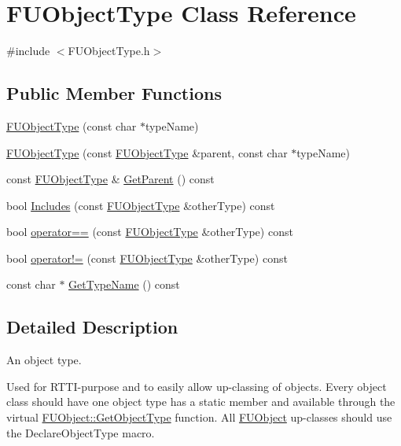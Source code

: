 \hypertarget{classFUObjectType}{
\section{FUObjectType Class Reference}
\label{classFUObjectType}
}


{\ttfamily \#include $<$FUObjectType.h$>$}

\subsection*{Public Member Functions}
\begin{DoxyCompactItemize}
\item 
\hyperlink{classFUObjectType_a2720b7c1dc89ba2b04067fb54651cfb2}{FUObjectType} (const char $\ast$typeName)
\item 
\hyperlink{classFUObjectType_a2ef2d00f85e58205470a634991bbd710}{FUObjectType} (const \hyperlink{classFUObjectType}{FUObjectType} \&parent, const char $\ast$typeName)
\item 
const \hyperlink{classFUObjectType}{FUObjectType} \& \hyperlink{classFUObjectType_a7b903f10975077d2d613a6cfe02762a8}{GetParent} () const 
\item 
bool \hyperlink{classFUObjectType_ac7bf4a03be4c6c482ca9e6df8771601b}{Includes} (const \hyperlink{classFUObjectType}{FUObjectType} \&otherType) const 
\item 
bool \hyperlink{classFUObjectType_a14945dfb834216b994e12e555c7e4ec6}{operator==} (const \hyperlink{classFUObjectType}{FUObjectType} \&otherType) const 
\item 
bool \hyperlink{classFUObjectType_a051455b488bf11ded50b271b261286dc}{operator!=} (const \hyperlink{classFUObjectType}{FUObjectType} \&otherType) const 
\item 
const char $\ast$ \hyperlink{classFUObjectType_a791d88a8d7b5fdfaad29c17f2050d8b0}{GetTypeName} () const 
\end{DoxyCompactItemize}


\subsection{Detailed Description}
An object type.

Used for RTTI-\/purpose and to easily allow up-\/classing of objects. Every object class should have one object type has a static member and available through the virtual \hyperlink{classFUObject_af41252d8da713eae73cd7c1e9a95a9da}{FUObject::GetObjectType} function. All \hyperlink{classFUObject}{FUObject} up-\/classes should use the DeclareObjectType macro. 

